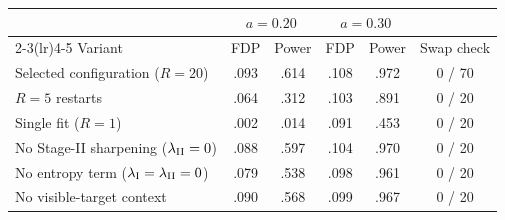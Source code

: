 \begin{tabular}{lccccc}
\toprule
 & \multicolumn{2}{c}{$a=0.20$} & \multicolumn{2}{c}{$a=0.30$} & \\\cmidrule(lr){2-3}\cmidrule(lr){4-5}
Variant & FDP & Power & FDP & Power & Swap check\\\midrule
Selected configuration ($R=20$) & .093 & .614 & .108 & .972 & 0 / 70\\
$R=5$ restarts & .064 & .312 & .103 & .891 & 0 / 20\\
Single fit ($R=1$) & .002 & .014 & .091 & .453 & 0 / 20\\
No Stage-II sharpening ($\lambda_{\rm II}=0$) & .088 & .597 & .104 & .970 & 0 / 20\\
No entropy term ($\lambda_{\rm I}=\lambda_{\rm II}=0$) & .079 & .538 & .098 & .961 & 0 / 20\\
No visible-target context & .090 & .568 & .099 & .967 & 0 / 20\\
\bottomrule
\end{tabular}

